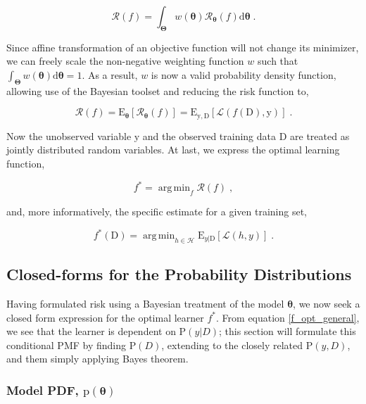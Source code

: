 \documentclass[12pt]{article}
\DeclareMathOperator*{\argmin}{arg\,min}
\begin{document}
\begin{equation}
\mathcal{R}(f) = \int_{\bm{\Theta}} w(\bm{\theta}) \mathcal{R}_{\bm{\theta}}(f)\mathrm{d}\bm{\theta} \;.
\end{equation}

Since affine transformation of an objective function will not change its minimizer, we can freely scale the non-negative weighting function $w$ such that $\int_{\bm{\Theta}} w(\bm{\theta}) \mathrm{d}\bm{\theta} = 1$. As a result, $w$ is now a valid probability density function, allowing use of the Bayesian toolset and reducing the risk function to,   

\begin{equation}
\mathcal{R}(f) = \text{E}_{\bm{\theta}}\left[  \mathcal{R}_{\bm{\theta}}(f) \right] = \text{E}_{\mathrm{y},\mathrm{D}}\left[ \mathcal{L}(f(\mathrm{D}),\mathrm{y}) \right] \;.
\end{equation}

Now the unobserved variable $\mathrm{y}$ and the observed training data $\mathrm{D}$ are treated as jointly distributed random variables. At last, we express the optimal learning function,

\begin{equation}
f^* = \argmin_{f} \mathcal{R}(f) \;,
\end{equation}

and, more informatively, the specific estimate for a given training set, 

\begin{equation} \label{f_opt_general}
f^*(\mathrm{D}) = \argmin_{h \in \mathcal{H}} \text{E}_{y|\mathrm{D}}\left[ \mathcal{L}(h,y) \right] \;.
\end{equation}





\subsection{Closed-forms for the Probability Distributions}

Having formulated risk using a Bayesian treatment of the model $\bm{\theta}$, we now seek a closed form expression for the optimal learner $f^*$. From equation \eqref{f_opt_general}, we see that the learner is dependent on $\text{P}(y|D)$; this section will formulate this conditional PMF by finding $\text{P}(D)$, extending to the closely related $\text{P}(y,D)$, and them simply applying Bayes theorem.


\subsubsection{Model PDF, $\text{p}(\bm{\theta})$}
\end{document}
